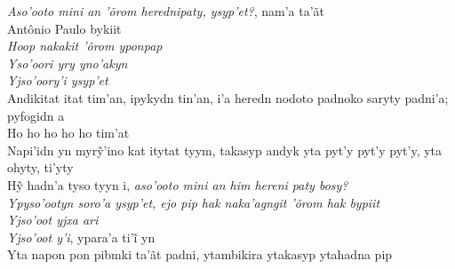 \begin{linenumbers}\begingroup\raggedright

\noindent   \textit{Aso'ooto mini an 'õrom herednipaty, ysyp'et?}, nam'a ta'ãt\\
 Antônio Paulo bykiit\\
  \textit{Hoop nakakit 'õrom yponpap}\\
  \textit{Yso'oori yry yno'akyn}\\
  \textit{Yjso'oory'i ysyp'et}\\
  Andikitat itat tim'an, ipykydn tin'an, i'a heredn nodoto padnoko
 saryty padni'a; pyfogidn a\\
  Ho ho ho ho ho tim'at\\
  Napi’idn yn myrỹ’ino kat itytat tyym, takasyp andyk yta pyt’y pyt’y pyt’y, yta ohyty, ti’yty\\
  Hỹ hadn’a tyso tyyn i, \textit{aso’ooto mini an him hereni paty bosy?}\\
  \textit{Ypyso'ootyn soro'a ysyp'et, ejo pip hak naka'agngit 'õrom hak bypiit}\\
  \textit{Yjso'oot yjxa ari}\\
  \textit{Yjso’oot y’i}, ypara’a ti’ĩ yn\\
  Yta napon pon pibmki ta'ãt padni, ytambikira ytakasyp ytahadna pip

\end{linenumbers}\endgroup

\bigskip

